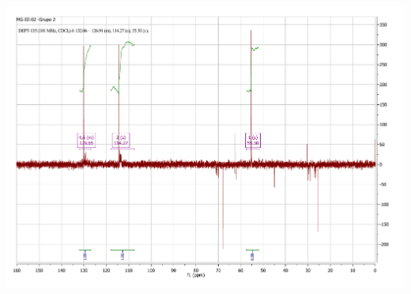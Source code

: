 \documentclass[fleqn,11pt]{SelfArx}
\begin{document}
{
	\begin{minipage}{\textheight}
		\centering
		\includegraphics[height=0.7\textheight]{RMN/DEPT.pdf}
		\label{DEPT}
	\end{minipage}
}
\end{document}
